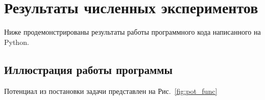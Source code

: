 \documentclass[a4paper,12pt]{article}
\begin{document}
\newpage

\section{Результаты численных экспериментов}\label{sec:results}

Ниже продемонстрированы результаты работы программного кода написанного на Python.

\subsection{Иллюстрация работы программы}\label{subsec:results_images}

Потенциал из постановки задачи представлен на Рис.~\ref{fig:pot_func}





\end{document}
